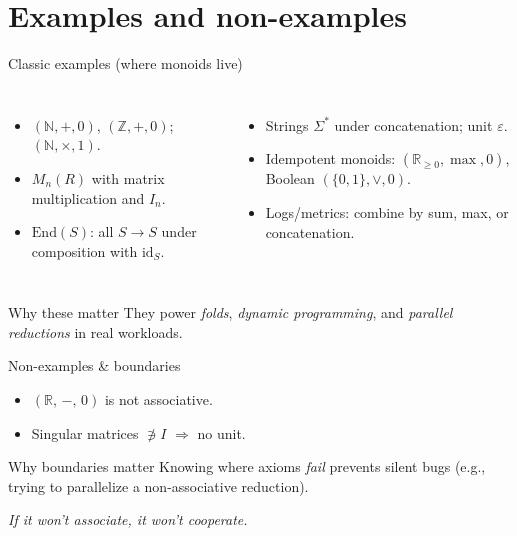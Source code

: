 \documentclass[aspectratio=169,11pt]{beamer}
\newcommand{\NN}{\mathbb{N}}
\newcommand{\ZZ}{\mathbb{Z}}
\newcommand{\RR}{\mathbb{R}}
\newcommand{\id}{\mathrm{id}}
\newcommand{\End}{\mathrm{End}}
\newcommand{\tline}[1]{\par\medskip\textcolor{transit}{\emph{#1}}\par\medskip}
\begin{document}
\section{Examples and non-examples}
\begin{frame}{Classic examples (where monoids live)}
\begin{columns}[T,onlytextwidth]
\begin{itemize}
  \item $(\NN,+,0)$, $(\ZZ,+,0)$; $(\NN,\times,1)$.
  \item $M_n(R)$ with matrix multiplication and $I_n$.
  \item $\End(S)$: all $S\to S$ under composition with $\id_S$.
\end{itemize}
\begin{itemize}
  \item Strings $\Sigma^\ast$ under concatenation; unit $\varepsilon$.
  \item Idempotent monoids: $(\RR_{\ge 0},\max,0)$, Boolean $(\{0,1\},\lor,0)$.
  \item Logs/metrics: combine by sum, max, or concatenation.
\end{itemize}
\end{columns}
\begin{alertblock}{Why these matter}
They power \emph{folds}, \emph{dynamic programming}, and \emph{parallel reductions} in real workloads.
\end{alertblock}
\end{frame}

\begin{frame}{Non-examples \& boundaries}
\begin{itemize}
  \item $(\RR,\,-,\,0)$ is not associative.
  \item Singular matrices $\not\ni I$ $\Rightarrow$ no unit.
\end{itemize}
\begin{alertblock}{Why boundaries matter}
Knowing where axioms \emph{fail} prevents silent bugs (e.g., trying to parallelize a non-associative reduction).
\end{alertblock}
\tline{If it won’t associate, it won’t cooperate.}
\end{frame}

\end{document}

